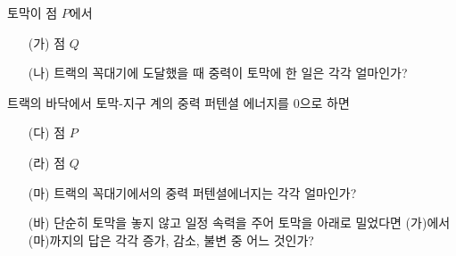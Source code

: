 \documentclass[floatfix,nofootinbib,superscriptaddress,fleqn]{revtex4-2}
\begin{document}
토막이 점 $P$에서
\begin{itemize}
\item[(가)] 점 $Q$
\item[(나)] 트랙의 꼭대기에 도달했을 때 중력이 토막에 한 일은 각각
  얼마인가?
\end{itemize}
트랙의 바닥에서 토막-지구 계의 중력 퍼텐셜 에너지를 $0$으로 하면 
\begin{itemize}
\item[(다)] 점 $P$
\item[(라)] 점 $Q$
\item[(마)] 트랙의 꼭대기에서의 중력 퍼텐셜에너지는 각각 얼마인가?
\item[(바)] 단순히 토막을 놓지 않고 일정 속력을 주어 토막을 아래로
  밀었다면 (가)에서 (마)까지의 답은 각각 증가, 감소, 불변 중 어느
  것인가? 
\end{itemize}
\end{document}
